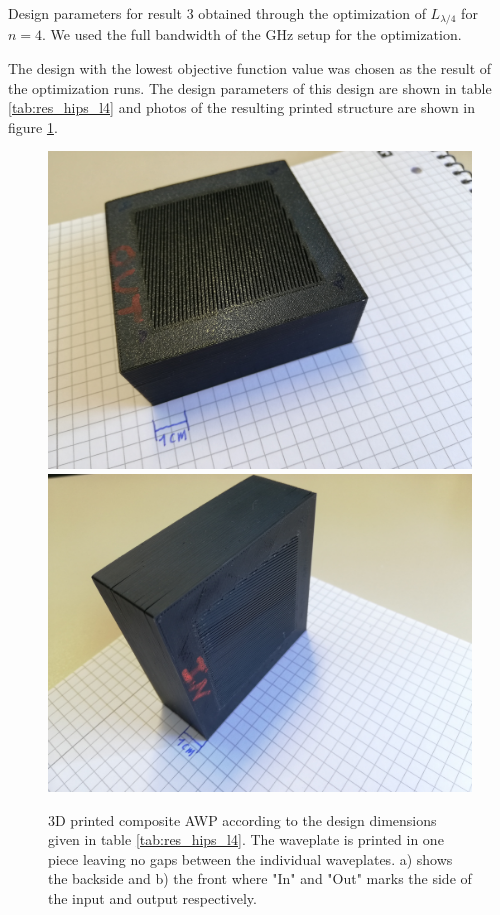 \begin{table}[ht]
    \centering
    
    \caption{Design parameters for result 3 obtained through the optimization of $L_{\lambda/4}$ for $n=4$. We used the full bandwidth of the GHz setup for the optimization.}
    \label{tab:res_hips_l4}
\end{table}

The design with the lowest objective function value was chosen as the result of the optimization runs. The design parameters of this design are shown in table \ref{tab:res_hips_l4} and photos of the resulting printed structure are shown in figure \ref{fig:sent2david}.

\begin{figure}[H]
    \centering
    \subcaptionbox{\label{fig:sent2david_1}}
        {\includegraphics[width=0.47\linewidth]{images/5_chapter05/polymer/sent2david_1.jpg}}
    \subcaptionbox{\label{fig:sent2david_2}}
        {\includegraphics[width=0.47\linewidth]{images/5_chapter05/polymer/sent2david_2.jpg}}
    \caption{3D printed composite AWP according to the design dimensions given in table \ref{tab:res_hips_l4}. The waveplate is printed in one piece leaving no gaps between the individual waveplates. a) shows the backside and b) the front where "In" and "Out" marks the side of the input and output respectively.}
    \label{fig:sent2david}
\end{figure}

